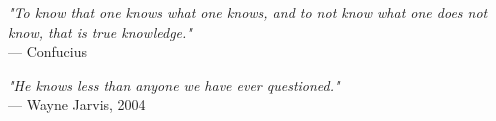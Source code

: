 \begin{flushright}
\emph{"To know that one knows what one knows, and to not know what one does not know, that is true knowledge."}\\
— Confucius
\end{flushright}

\begin{flushright}
\emph{"He knows less than anyone we have ever questioned."}\\
— Wayne Jarvis, 2004
\end{flushright}
